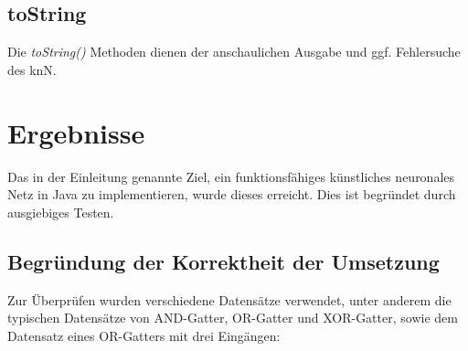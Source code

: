 \documentclass[paper=A4,pagesize=auto,12pt,headinclude=true,footinclude=true,BCOR=0mm,DIV=calc]{scrartcl}
\begin{document}
\subsection{toString}
Die \textit{toString()} Methoden dienen der anschaulichen Ausgabe und ggf. Fehlersuche des knN. 

\vspace{2cm}

\section{Ergebnisse}
Das in der Einleitung genannte Ziel, ein funktionsfähiges künstliches neuronales Netz in Java zu implementieren, wurde dieses erreicht. Dies ist begründet durch ausgiebiges Testen.
\subsection{Begründung der Korrektheit der Umsetzung}
Zur Überprüfen wurden verschiedene Datensätze verwendet, unter anderem die typischen Datensätze von AND-Gatter, OR-Gatter und XOR-Gatter, sowie dem Datensatz eines OR-Gatters mit drei Eingängen:
\end{document}
